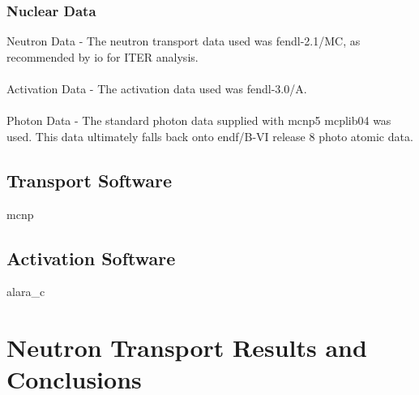 \documentclass[12pt]{article}
\begin{document}
\subsubsection*{Nuclear Data}
Neutron Data - The neutron transport data used was \gls{fendl}-2.1/MC, as 
recommended by \gls{io} for ITER analysis. 
\\
\\
Activation Data - The activation data used was \gls{fendl}-3.0/A.
\\
\\
Photon Data - The standard photon data supplied with \gls{mcnp}5 mcplib04 was 
used. This data ultimately falls back onto \gls{endf}/B-VI release 8 photo
atomic data.
\subsection{Transport Software}
\gls{mcnp}
\subsection{Activation Software}
\gls{alara_c}
\newpage
\clearpage
\section{Neutron Transport Results and Conclusions}
\end{document}
